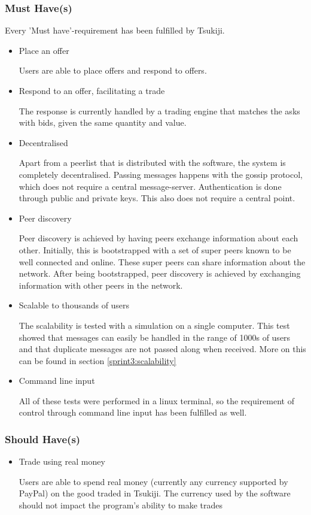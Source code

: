 \subsubsection{Must Have(s)}
Every 'Must have'-requirement has been fulfilled by Tsukiji.

\begin{itemize}
\item Place an offer

Users are able to place offers and respond to offers.

\item Respond to an offer, facilitating a trade

The response is currently handled by a trading engine that matches the asks with bids, given the same quantity and value.

\item Decentralised

Apart from a peerlist that is distributed with the software, the system is completely decentralised.
Passing messages happens with the gossip protocol, which does not require a central message-server.
Authentication is done through public and private keys.
This also does not require a central point.

\item Peer discovery 

Peer discovery is achieved by having peers exchange information about each other.
Initially, this is bootstrapped with a set of super peers known to be well connected and online.
These super peers can share information about the network.
After being bootstrapped, peer discovery is achieved by exchanging information with other peers in the network.

\item Scalable to thousands of users

The scalability is tested with a simulation on a single computer.
This test showed that messages can easily be handled in the range of 1000s of users and that duplicate messages are not passed along when received.
More on this can be found in section \ref{sprint3:scalability}

\item Command line input

All of these tests were performed in a linux terminal, so the requirement of control through command line input has been fulfilled as well.
\end{itemize}

\subsubsection{Should Have(s)}
\begin{itemize}
\item Trade using real money

Users are able to spend real money (currently any currency supported by PayPal) on the good traded in Tsukiji.
The currency used by the software should not impact the program's ability to make trades
\end{itemize}

